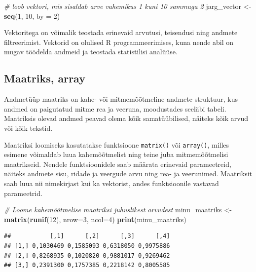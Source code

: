 \documentclass[
]{book}
\newenvironment{Shaded}{\begin{snugshade}}{\end{snugshade}}
\newcommand{\AttributeTok}[1]{\textcolor[rgb]{0.13,0.29,0.53}{#1}}
\newcommand{\CommentTok}[1]{\textcolor[rgb]{0.56,0.35,0.01}{\textit{#1}}}
\newcommand{\DecValTok}[1]{\textcolor[rgb]{0.00,0.00,0.81}{#1}}
\newcommand{\FunctionTok}[1]{\textcolor[rgb]{0.13,0.29,0.53}{\textbf{#1}}}
\newcommand{\NormalTok}[1]{#1}
\newcommand{\OtherTok}[1]{\textcolor[rgb]{0.56,0.35,0.01}{#1}}
\renewenvironment{Shaded} {\begin{snugshade}\footnotesize} {\end{snugshade}}
\begin{document}
\begin{Shaded}
\begin{Highlighting}[]
\CommentTok{\# loob vektori, mis sisaldab arve vahemikus 1 kuni 10 sammuga 2}
\NormalTok{jarg\_vector }\OtherTok{\textless{}{-}} \FunctionTok{seq}\NormalTok{(}\DecValTok{1}\NormalTok{, }\DecValTok{10}\NormalTok{, }\AttributeTok{by =} \DecValTok{2}\NormalTok{) }
\end{Highlighting}
\end{Shaded}

Vektoritega on võimalik teostada erinevaid arvutusi, teisendusi ning andmete filtreerimist. Vektorid on olulised R programmeerimises, kuna nende abil on mugav töödelda andmeid ja teostada statistilisi analüüse.

\subsection{Maatriks, array}\label{maatriks-array}

Andmetüüp maatriks on kahe- või mitmemõõtmeline andmete struktuur, kus andmed on paigutatud mitme rea ja veeruna, moodustades seeläbi tabeli. Maatriksis olevad andmed peavad olema kõik samatüübilised, näiteks kõik arvud või kõik tekstid.

Maatriksi loomiseks kasutatakse funktsioone \texttt{matrix()} või \texttt{array()}, milles esimene võimaldab luua kahemõõtmelist ning teine juba mitmemõõtmelisi maatrikseid. Nendele funktsioonidele saab määrata erinevaid parameetreid, näiteks andmete sisu, ridade ja veergude arvu ning rea- ja veerunimed. Maatriksit saab luua nii nimekirjast kui ka vektorist, andes funktsioonile vastavad parameetrid.

\begin{Shaded}
\begin{Highlighting}[]
\CommentTok{\# Loome kahemõõtmelise maatriksi juhuslikest arvudest}
\NormalTok{minu\_maatriks }\OtherTok{\textless{}{-}} \FunctionTok{matrix}\NormalTok{(}\FunctionTok{runif}\NormalTok{(}\DecValTok{12}\NormalTok{), }\AttributeTok{nrow=}\DecValTok{3}\NormalTok{, }\AttributeTok{ncol=}\DecValTok{4}\NormalTok{)}
\FunctionTok{print}\NormalTok{(minu\_maatriks)}
\end{Highlighting}
\end{Shaded}

\begin{verbatim}
##           [,1]      [,2]      [,3]      [,4]
## [1,] 0,1030469 0,1585093 0,6318050 0,9975886
## [2,] 0,8268935 0,1020820 0,9881017 0,9269462
## [3,] 0,2391300 0,1757385 0,2218142 0,8005585
\end{verbatim}
\end{document}
